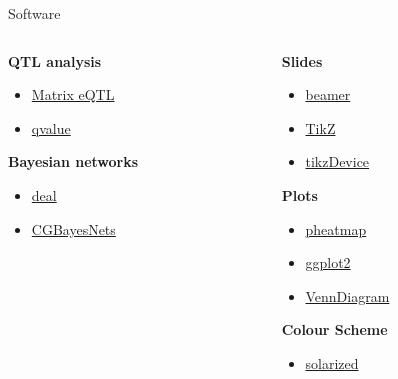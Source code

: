 \documentclass{beamer}
\begin{document}
\begin{frame}{Software}
    \begin{columns}
    \begin{column}{0.4\textwidth}
    \textbf{QTL analysis}
    \begin{itemize}
        \item
            \href{http://www.bios.unc.edu/research/genomic_software/Matrix_eQTL}
            {Matrix eQTL}
        \item
            \href{http://www.bioconductor.org/packages/release/bioc/html/qvalue.html}
            {qvalue}
    \end{itemize}
    \textbf{Bayesian networks}
    \begin{itemize}
        \item \href{http://cran.r-project.org/web/packages/deal/index.html}
                   {deal}
        \item \href{http://www.cgbayesnets.com}{CGBayesNets}
    \end{itemize}
    \end{column}
    \begin{column}{0.4\textwidth}
    \textbf{Slides}
    \begin{itemize}
        \item \href{http://www.ctan.org/pkg/beamer}{beamer}
        \item \href{https://www.ctan.org/pkg/pgf}{TikZ}
        \item
            \href{http://cran.r-project.org/web/packages/tikzDevice/index.html}
            {tikzDevice}
    \end{itemize}
    \textbf{Plots}
    \begin{itemize}
        \item \href{http://cran.r-project.org/web/packages/pheatmap/index.html}
                   {pheatmap}
        \item \href{http://ggplot2.org/}{ggplot2}
        \item
            \href{http://cran.r-project.org/web/packages/VennDiagram/index.html}
            {VennDiagram}
    \end{itemize}
    \textbf{Colour Scheme}
    \begin{itemize}
        \item \href{http://ethanschoonover.com/solarized}{solarized}
    \end{itemize}
    \end{column}
    \end{columns}
\end{frame}
\end{document}
